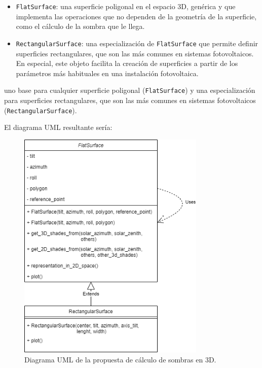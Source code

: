 \begin{itemize}
    \item \texttt{FlatSurface}: una superficie poligonal en el espacio 3D, genérica y que implementa las operaciones que no dependen de la geometría de la superficie, como el cálculo de la sombra que le llega.
    \item \texttt{RectangularSurface}: una especialización de \texttt{FlatSurface} que permite definir superficies rectangulares, que son las más comunes en sistemas fotovoltaicos. En especial, este objeto facilita la creación de superficies a partir de los parámetros más habituales en una instalación fotovoltaica.
\end{itemize}

uno base para cualquier superficie poligonal (\texttt{FlatSurface}) y una especialización para superficies rectangulares, que son las más comunes en sistemas fotovoltaicos (\texttt{RectangularSurface}).

El diagrama UML resultante sería:

\begin{figure}[H]
    \centering
    \includegraphics[width=0.8\textwidth]{./images/shading_3d/shading_classes.png}
    \caption{Diagrama UML de la propuesta de cálculo de sombras en 3D.}
    \label{fig:uml_sombreado}
\end{figure}

